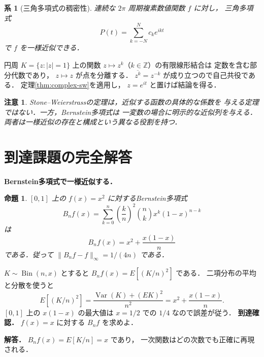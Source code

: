 \documentclass[a5paper,10pt,onecolumn]{jsarticle}
\makeatletter
\theoremstyle{mathnotetheorem}
\newtheorem{proposition}[theorem]{命題}
\newtheorem{corollary}[theorem]{系}
\newtheorem{remark}[theorem]{注意}
\renewcommand{\proofname}{証明}
\renewenvironment{proof}[1][\proofname]{%
  \par\pushQED{\qed}\normalfont\topsep4\p@\@plus2\p@\relax
  \trivlist\item[\hskip\labelsep\bfseries #1]\ignorespaces
}{\popQED\endtrivlist\@endpefalse}
\makeatother
\begin{document}
\begin{corollary}[三角多項式の稠密性]
連続な $2\pi$ 周期複素数値関数 $f$ に対し，
三角多項式
\[
 P(t)=\sum_{k=-N}^Nc_ke^{ikt}
\]
で $f$ を一様近似できる．
\end{corollary}
\begin{proof}
円周 $K=\{z:|z|=1\}$ 上の関数
$z\mapsto z^k$（$k\in\mathbb Z$）の有限線形結合は
定数を含む部分代数であり，
$z\mapsto z$ が点を分離する．
$\overline{z^k}=z^{-k}$ が成り立つので自己共役である．
定理\ref{thm:complex-sw}を適用し，
$z=e^{it}$ と置けば結論を得る．
\end{proof}

\begin{remark}
Stone--Weierstrassの定理は，近似する函数の具体的な係数を
与える定理ではない．一方，Bernstein多項式は
一変数の場合に明示的な近似列を与える．
両者は一様近似の存在と構成という異なる役割を持つ．
\end{remark}

\section{到達課題の完全解答}
\noindent\textbf{Bernstein多項式で一様近似する．}
\begin{proposition}
$[0,1]$ 上の $f(x)=x^2$ に対するBernstein多項式
\[
B_nf(x)=\sum_{k=0}^n
\left(\frac kn\right)^2\binom nkx^k(1-x)^{n-k}
\]
は
\[
B_nf(x)=x^2+\frac{x(1-x)}n
\]
である．従って
$\|B_nf-f\|_\infty=1/(4n)$ である．
\end{proposition}
\begin{proof}
$K\sim\operatorname{Bin}(n,x)$ とすると
$B_nf(x)=E[(K/n)^2]$ である．
二項分布の平均と分散を使うと
\[
E[(K/n)^2]
=\frac{\operatorname{Var}(K)+(EK)^2}{n^2}
=x^2+\frac{x(1-x)}n.
\]
$[0,1]$ 上の $x(1-x)$ の最大値は
$x=1/2$ での $1/4$ なので誤差が従う．
\end{proof}
\noindent\textbf{到達確認．}
$f(x)=x$ に対する $B_nf$ を求めよ．
\par\noindent\textbf{解答．}
$B_nf(x)=E[K/n]=x$ であり，
一次関数はどの次数でも正確に再現される．
\end{document}
